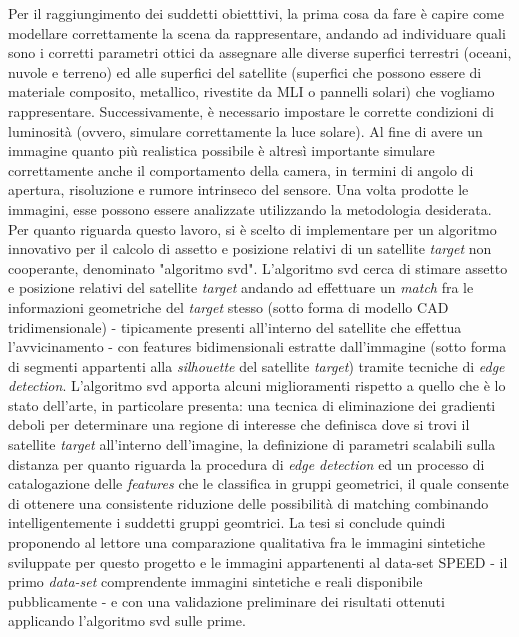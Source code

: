 Per il raggiungimento dei suddetti obietttivi, la prima cosa da fare è capire come modellare correttamente la scena da rappresentare, andando ad individuare quali sono i corretti parametri ottici da assegnare alle diverse superfici terrestri (oceani, nuvole e terreno) ed alle superfici del satellite (superfici che possono essere di materiale composito, metallico, rivestite da MLI o pannelli solari) che vogliamo rappresentare. Successivamente, è necessario impostare le corrette condizioni di luminosità (ovvero, simulare correttamente la luce solare). Al fine di avere un immagine quanto più realistica possibile è altresì importante simulare correttamente anche il comportamento della camera, in termini di angolo di apertura, risoluzione e rumore intrinseco del sensore. Una volta prodotte le immagini, esse possono essere analizzate utilizzando la metodologia desiderata. Per quanto riguarda questo lavoro, si è scelto di implementare per un algoritmo innovativo per il calcolo di assetto e posizione relativi di un satellite \textit{target} non cooperante, denominato "algoritmo \acrshort{svd}".
L'algoritmo \acrshort{svd} cerca di stimare assetto e posizione relativi del satellite \textit{target} andando ad effettuare un \textit{match} fra le informazioni geometriche del \textit{target} stesso (sotto forma di modello CAD tridimensionale)  - tipicamente presenti all'interno del satellite che effettua l'avvicinamento - con features bidimensionali estratte dall'immagine (sotto forma di segmenti appartenti alla \textit{silhouette} del satellite \textit{target}) tramite tecniche di \textit{edge detection}.
L'algoritmo \acrshort{svd} apporta alcuni miglioramenti rispetto a quello che è lo stato dell'arte, in particolare presenta: una tecnica di eliminazione dei gradienti deboli per determinare una regione di interesse che definisca dove si trovi il satellite \textit{target} all'interno dell'imagine, la definizione di parametri scalabili sulla distanza per quanto riguarda la procedura di \textit{edge detection} ed un processo di catalogazione delle \textit{features} che le classifica in gruppi geometrici, il quale consente di ottenere una consistente riduzione delle possibilità di matching combinando intelligentemente i suddetti gruppi geomtrici. 
La tesi si conclude quindi proponendo al lettore una comparazione qualitativa fra le immagini sintetiche sviluppate per questo progetto  e le immagini appartenenti al data-set SPEED - il primo \textit{data-set} comprendente immagini sintetiche e reali disponibile pubblicamente - e con una validazione preliminare dei risultati ottenuti applicando l'algoritmo \acrshort{svd} sulle prime.